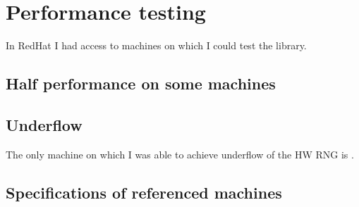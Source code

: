\chapter{Performance testing} \label{chap:performance}
In RedHat I had access to machines on which I could test the library. 


\section{Half performance on some machines}

\section{Underflow}
The only machine on which I was able to achieve underflow of the HW RNG is .


\section{Specifications of referenced machines}

